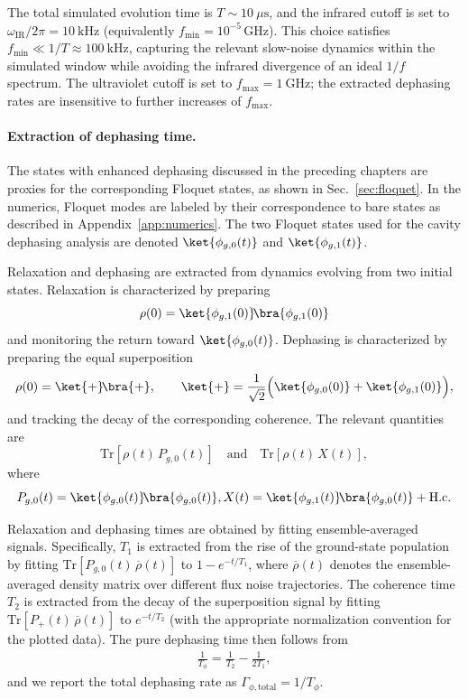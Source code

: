 The total simulated evolution time is $T\sim 10~\mu\mathrm{s}$, and the infrared cutoff
is set to $\omega_{\mathrm{IR}}/2\pi=10~\mathrm{kHz}$ (equivalently
$f_{\min}=10^{-5}\,\mathrm{GHz}$). This choice satisfies $f_{\min}\ll 1/T \approx 100~\mathrm{kHz}$,
capturing the relevant slow-noise dynamics within the simulated window while avoiding the
infrared divergence of an ideal $1/f$ spectrum. The ultraviolet cutoff is set to
$f_{\max}=1~\mathrm{GHz}$; the extracted dephasing rates are insensitive to further
increases of $f_{\max}$.

\paragraph{Extraction of dephasing time.} The states with enhanced dephasing discussed in the preceding chapters are proxies for the corresponding Floquet states, as shown in Sec.~\ref{sec:floquet}.
In the numerics, Floquet modes are labeled by their correspondence to bare states as
described in Appendix~\ref{app:numerics}. The two Floquet states used for the cavity
dephasing analysis
are denoted $\ket{\phi_{g,0}(t)}$ and $\ket{\phi_{g,1}(t)}$.

Relaxation and dephasing are extracted from dynamics evolving from two initial states. Relaxation is
characterized by preparing
\[
\rho(0)=\ket{\phi_{g,1}(0)}\!\bra{\phi_{g,1}(0)}
\]
and monitoring the return toward \(\ket{\phi_{g,0}(t)}\). Dephasing is characterized by preparing the equal superposition
\[
\rho(0)=\ket{+}\!\bra{+},
\qquad
\ket{+}=\frac{1}{\sqrt{2}}\Big(\ket{\phi_{g,0}(0)}+\ket{\phi_{g,1}(0)}\Big),
\]
and tracking the decay of the corresponding coherence. The relevant quantities are
\[
\mathrm{Tr}\!\left[\rho(t)\,P_{g,0}(t)\right]
\quad \text{and} \quad
\mathrm{Tr}\!\left[\rho(t)\,X(t)\right],
\]
where
\[
P_{g,0}(t)=\ket{\phi_{g,0}(t)}\!\bra{\phi_{g,0}(t)},
X(t)=\ket{\phi_{g,1}(t)}\!\bra{\phi_{g,0}(t)}+\mathrm{H.c.}
\]


Relaxation and dephasing times are obtained by fitting ensemble-averaged signals.
Specifically, $T_1$ is extracted from the rise of the ground-state population by fitting
$\mathrm{Tr}\!\left[P_{g,0}(t)\,\overline{\rho}(t)\right]$ to $1-e^{-t/T_1}$, where
$\overline{\rho}(t)$ denotes the ensemble-averaged density matrix over different flux noise trajectories. The coherence time $T_2$
is extracted from the decay of the superposition signal by fitting
$\mathrm{Tr}\!\left[P_{+}(t)\,\overline{\rho}(t)\right]$ to $e^{-t/T_2}$ (with the appropriate
normalization convention for the plotted data). The pure dephasing time then follows from
\begin{align}
\frac{1}{T_\phi}=\frac{1}{T_2}-\frac{1}{2T_1},
\end{align}
and we report the total dephasing rate as $\Gamma_{\phi,\mathrm{total}}=1/T_\phi$.

